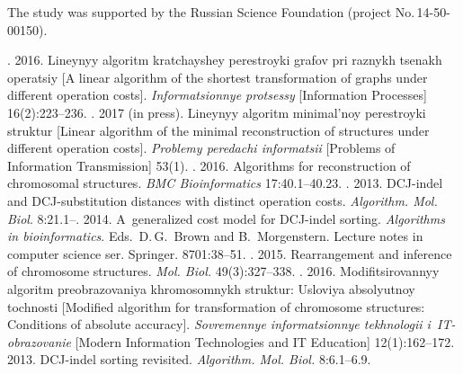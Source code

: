 

\vspace*{-24pt}

\Ack
\noindent
The study was supported by the Russian Science Foundation (project  
No.\,14-50-00150).




  \begin{multicols}{2}

\renewcommand{\bibname}{\protect\rmfamily References}

{\small\frenchspacing
 {%
 \begin{thebibliography}{9}
. 2016. Lineynyy algoritm 
kratchayshey perestroyki grafov pri raznykh tsenakh operatsiy [A linear algorithm of 
the shortest transformation of graphs under different operation costs]. 
\textit{Informatsionnye protsessy} [Information Processes] 16(2):223--236.
. 2017 (in press). Lineynyy algoritm 
minimal'noy perestroyki struktur [Linear algorithm of the minimal reconstruction of 
structures under different operation costs]. \textit{Problemy peredachi informatsii} 
[Problems of Information Transmission] 53(1). 
. 2016. Algorithms for reconstruction of chromosomal structures. 
\textit{BMC Bioinformatics} 17:40.1--40.23.
. 2013.  
DCJ-indel and DCJ-substitution distances with distinct operation costs. 
\textit{Algorithm. Mol. Biol}. 8:21.1--.
 2014. A~generalized cost model for DCJ-indel sorting. 
\textit{Algorithms in bioinformatics}. Eds.\ D.\,G.~Brown and B.~Morgenstern.
{Lecture notes in computer science ser.} Springer. 8701:38--51.
. 2015. 
Rearrangement and 
inference of chromosome structures. \textit{Mol. 
Biol.} 49(3):327--338. 
. 2016.  
Modifitsirovannyy algoritm preobrazovaniya khromosomnykh struktur: Usloviya 
absolyutnoy tochnosti [Modified algorithm for transformation of chromosome structures: 
Conditions of absolute accuracy]. \textit{Sovremennye informatsionnye tekhnologii 
i~IT-obrazovanie} [Modern Information Technologies and IT Education] 12(1):162--172.
 2013. DCJ-indel sorting revisited. \textit{Algorithm.  
Mol. Biol.} 8:6.1--6.9.
\end{thebibliography}

}}
\end{multicols}
